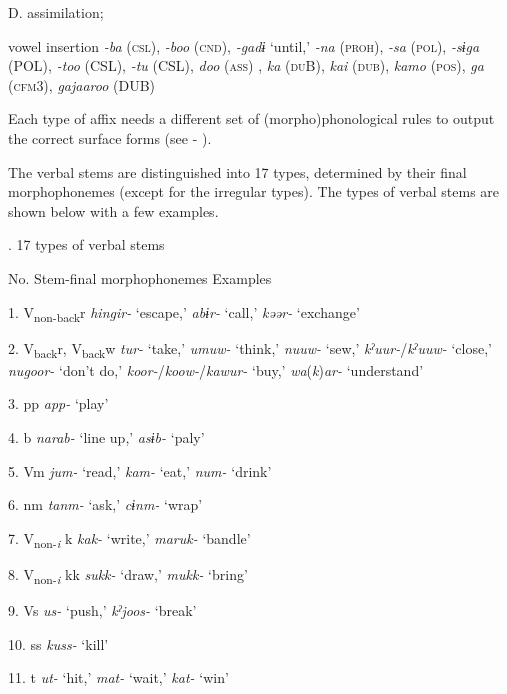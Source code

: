 D.  assimilation;

vowel insertion  \textit{{}-ba} (\textsc{csl}), \textit{{}-boo} (\textsc{cnd}), \textit{{}-gadɨ} ‘until,’ \textit{{}-na} (\textsc{proh}), \textit{{}-sa} (\textsc{pol}), \textit{{}-sɨga} (POL), \textit{{}-too} (CSL), \textit{{}-tu} (CSL), \textit{doo} (\textsc{ass}) , \textit{ka} (\textsc{du}B), \textit{kai} (\textsc{dub}), \textit{kamo} (\textsc{pos}), \textit{ga} (\textsc{cfm}3), \textit{gajaaroo} (DUB)

Each type of affix needs a different set of (morpho)phonological rules to output the correct surface forms (see  - ).

The verbal stems are distinguished into 17 types, determined by their final morphophonemes (except for the irregular types). The types of verbal stems are shown below with a few examples.

\begin{styleBeschriftung}
\textmd{}\textmd{. 17 types of verbal stems}
\end{styleBeschriftung}

No.  Stem-final morphophonemes  Examples

1.  V\textsubscript{non-back}r  \textit{hingir-} ‘escape,’ \textit{abɨr-} ‘call,’ \textit{kəər-} ‘exchange’

2.  V\textsubscript{back}r, V\textsubscript{back}w  \textit{tur-} ‘take,’ \textit{umuw-} ‘think,’ \textit{nuuw-} ‘sew,’ \textit{kˀuur-}/\textit{kˀuuw-} ‘close,’ \textit{nugoor-} ‘don’t do,’ \textit{koor-}/\textit{koow-}/\textit{kawur-} ‘buy,’ \textit{wa}(\textit{k})\textit{ar-} ‘understand’

3.  pp  \textit{app-} ‘play’

4.  b  \textit{narab-} ‘line up,’ \textit{asɨb-} ‘paly’

5.  Vm  \textit{jum-} ‘read,’ \textit{kam-} ‘eat,’ \textit{num-} ‘drink’

6.  nm  \textit{tanm-} ‘ask,’ \textit{cɨnm-} ‘wrap’

7.  V\textsubscript{non-}\textit{\textsubscript{i} }k  \textit{kak-} ‘write,’ \textit{maruk-} ‘bandle’

8.  V\textsubscript{non-}\textit{\textsubscript{i} }kk  \textit{sukk-} ‘draw,’ \textit{mukk-} ‘bring’

9.  Vs  \textit{us-} ‘push,’ \textit{kˀjoos-} ‘break’

10.  ss  \textit{kuss-} ‘kill’

11.  t  \textit{ut-} ‘hit,’ \textit{mat-} ‘wait,’ \textit{kat-} ‘win’

